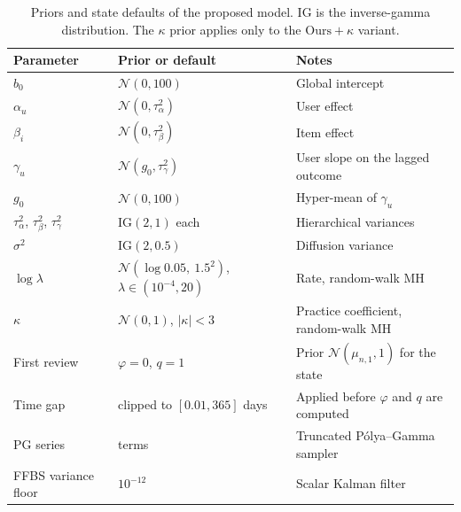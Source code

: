 \begin{table}[htbp]
  \centering
  \caption[Priors and state defaults]{Priors and state defaults of the proposed model. IG is the inverse-gamma distribution.
    The $\kappa$ prior applies only to the $\text{Ours}+\kappa$ variant.}
  \label{tab:appC-priors}
  \begin{tabular}{@{}>{\raggedright\arraybackslash}p{3.5cm}>{\raggedright\arraybackslash}p{5.0cm}>{\raggedright\arraybackslash}p{5.0cm}@{}}
    \toprule
    Parameter & Prior or default & Notes \\
    \midrule
    $b_0$ & $\mathcal N(0, 100)$ & Global intercept \\
    $\alpha_u$ & $\mathcal N(0, \tau^2_\alpha)$ & User effect \\
    $\beta_i$ & $\mathcal N(0, \tau^2_\beta)$ & Item effect \\
    $\gamma_u$ & $\mathcal N(g_0, \tau^2_\gamma)$ & User slope on the lagged outcome \\
    $g_0$ & $\mathcal N(0, 100)$ & Hyper-mean of $\gamma_u$ \\
    $\tau^2_\alpha$, $\tau^2_\beta$, $\tau^2_\gamma$ & IG$(2, 1)$ each & Hierarchical variances \\
    $\sigma^2$ & IG$(2, 0.5)$ & Diffusion variance \\
    $\log\lambda$ & $\mathcal N(\log 0.05,\ 1.5^2)$, $\lambda \in (10^{-4}, 20)$ & Rate, random-walk MH \\
    $\kappa$ & $\mathcal N(0, 1)$, $\lvert\kappa\rvert < 3$ & Practice coefficient, random-walk MH \\
    First review & $\varphi = 0$, $q = 1$ & Prior $\mathcal N(\mu_{n,1}, 1)$ for the state \\
    Time gap & clipped to $[0.01, 365]$ days & Applied before $\varphi$ and $q$ are computed \\
    PG series & 200 terms & Truncated P\'olya--Gamma sampler \\
    FFBS variance floor & $10^{-12}$ & Scalar Kalman filter \\
    \bottomrule
  \end{tabular}
\end{table}

